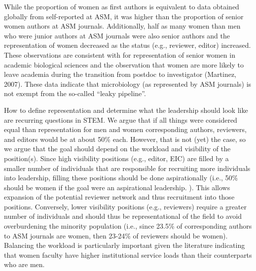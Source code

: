 \documentclass[11pt,]{article}
\begin{document}
While the proportion of women as first authors is equivalent to data
obtained globally from self-reported at ASM, it was higher than the
proportion of senior women authors at ASM journals. Additionally, half
as many women than men who were junior authors at ASM journals were also
senior authors and the representation of women decreased as the status
(e.g., reviewer, editor) increased. These observations are consistent
with for representation of senior women in academic biological sciences
and the observation that women are more likely to leave academia during
the transition from postdoc to investigator (Martinez, 2007). These data
indicate that microbiology (as represented by ASM journals) is not
exempt from the so-called ``leaky pipeline''.

How to define representation and determine what the leadership should
look like are recurring questions in STEM. We argue that if all things
were considered equal than representation for men and women
corresponding authors, reviewers, and editors would be at about 50\%
each. However, that is not (yet) the case, so we argue that the goal
should depend on the workload and visibility of the position(s). Since
high visibility positions (e.g., editor, EIC) are filled by a smaller
number of individuals that are responsible for recruiting more
individuals into leadership, filling these positions should be done
aspirationally (i.e., 50\% should be women if the goal were an
aspirational leadership. ). This allows expansion of the potential
reviewer network and thus recruitment into those positions. Conversely,
lower visibility positions (e.g., reviewers) require a greater number of
individuals and should thus be representational of the field to avoid
overburdening the minority population (i.e., since 23.5\% of
corresponding authors to ASM journals are women, then 23-24\% of
reviewers should be women). Balancing the workload is particularly
important given the literature indicating that women faculty have higher
institutional service loads than their counterparts who are men.
\end{document}
